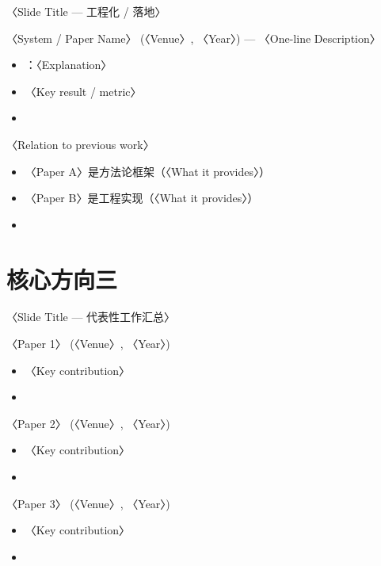 \begin{frame}{〈Slide Title — 工程化 / 落地〉}
  \begin{block}{〈System / Paper Name〉 (〈Venue〉, 〈Year〉) — 〈One-line Description〉}
    \begin{itemize}
      \item {}：〈Explanation〉
      \item 〈Key result / metric〉
      \item {}
    \end{itemize}
  \end{block}
  \tightgap
  \begin{block}{〈Relation to previous work〉}
    \begin{itemize}
      \item 〈Paper A〉是方法论框架（〈What it provides〉）
      \item 〈Paper B〉是工程实现（〈What it provides〉）
      \item {}
    \end{itemize}
  \end{block}
\end{frame}

\renewcommand{\secblurb}{〈本节一句话主旨：第三个核心方向的贡献与影响〉}
\section{核心方向三}

\begin{frame}{〈Slide Title — 代表性工作汇总〉}
  \begin{block}{〈Paper 1〉 (〈Venue〉, 〈Year〉)}
    \begin{itemize}
      \item 〈Key contribution〉
      \item {}
    \end{itemize}
  \end{block}
  \tightgap
  \begin{block}{〈Paper 2〉 (〈Venue〉, 〈Year〉)}
    \begin{itemize}
      \item 〈Key contribution〉
      \item {}
    \end{itemize}
  \end{block}
  \tightgap
  \begin{block}{〈Paper 3〉 (〈Venue〉, 〈Year〉)}
    \begin{itemize}
      \item 〈Key contribution〉
      \item {}
    \end{itemize}
  \end{block}
\end{frame}

